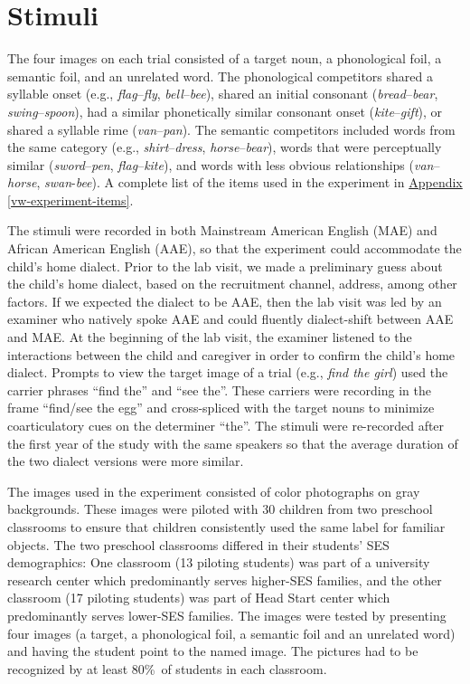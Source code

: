 \documentclass [11pt, proquest] {uwthesis}[2015/03/03]
\begin{document}
\section{Stimuli}\label{stimuli}

The four images on each trial consisted of a target noun, a phonological
foil, a semantic foil, and an unrelated word. The phonological
competitors shared a syllable onset (e.g., \emph{flag}--\emph{fly},
\emph{bell}--\emph{bee}), shared an initial consonant
(\emph{bread}--\emph{bear}, \emph{swing}--\emph{spoon}), had a similar
phonetically similar consonant onset (\emph{kite}--\emph{gift}), or
shared a syllable rime (\emph{van}--\emph{pan}). The semantic
competitors included words from the same category (e.g.,
\emph{shirt}--\emph{dress}, \emph{horse}--\emph{bear}), words that were
perceptually similar (\emph{sword}--\emph{pen},
\emph{flag}--\emph{kite}), and words with less obvious relationships
(\emph{van}--\emph{horse}, \emph{swan}-\emph{bee}). A complete list of
the items used in the experiment in
\protect\hyperlink{vw-experiment-items}{Appendix
\ref{vw-experiment-items}}.

The stimuli were recorded in both Mainstream American English (MAE) and
African American English (AAE), so that the experiment could accommodate
the child's home dialect. Prior to the lab visit, we made a preliminary
guess about the child's home dialect, based on the recruitment channel,
address, among other factors. If we expected the dialect to be AAE, then
the lab visit was led by an examiner who natively spoke AAE and could
fluently dialect-shift between AAE and MAE. At the beginning of the lab
visit, the examiner listened to the interactions between the child and
caregiver in order to confirm the child's home dialect. Prompts to view
the target image of a trial (e.g., \emph{find the girl}) used the
carrier phrases ``find the'' and ``see the''. These carriers were
recording in the frame ``find/see the egg'' and cross-spliced with the
target nouns to minimize coarticulatory cues on the determiner ``the''.
The stimuli were re-recorded after the first year of the study with the
same speakers so that the average duration of the two dialect versions
were more similar.

The images used in the experiment consisted of color photographs on gray
backgrounds. These images were piloted with 30 children from two
preschool classrooms to ensure that children consistently used the same
label for familiar objects. The two preschool classrooms differed in
their students' SES demographics: One classroom (13 piloting students)
was part of a university research center which predominantly serves
higher-SES families, and the other classroom (17 piloting students) was
part of Head Start center which predominantly serves lower-SES families.
The images were tested by presenting four images (a target, a
phonological foil, a semantic foil and an unrelated word) and having the
student point to the named image. The pictures had to be recognized by
at least 80\%~of students in each classroom.
\end{document}
